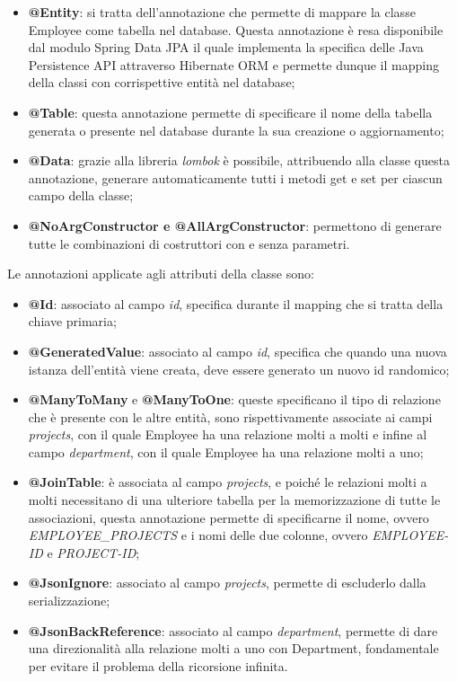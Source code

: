 \begin{itemize}
  \item \textbf{@Entity}: si tratta dell'annotazione che permette di mappare la classe Employee come tabella nel database. Questa annotazione è resa disponibile dal modulo Spring Data JPA il quale implementa la specifica delle Java Persistence API attraverso Hibernate ORM e permette dunque il mapping della classi con corrispettive entità nel database;
  \item \textbf{@Table}: questa annotazione permette di specificare il nome della tabella generata o presente nel database durante la sua creazione o aggiornamento;
  \item \textbf{@Data}: grazie alla libreria \textit{lombok} è possibile, attribuendo alla classe questa annotazione, generare automaticamente tutti i metodi get e set per ciascun campo della classe;
  \item \textbf{@NoArgConstructor e @AllArgConstructor}: permettono di generare tutte le combinazioni di costruttori con e senza parametri.
\end{itemize}
Le annotazioni applicate agli attributi della classe sono:
\begin{itemize}
  \item \textbf{@Id}: associato al campo \textit{id}, specifica durante il mapping che si tratta della chiave primaria;
  \item \textbf{@GeneratedValue}: associato al campo \textit{id}, specifica che quando una nuova istanza dell'entità viene creata, deve essere generato un nuovo id randomico;
  \item \textbf{@ManyToMany} e \textbf{@ManyToOne}: queste specificano il tipo di relazione che è presente con le altre entità, sono rispettivamente associate ai campi \textit{projects}, con il quale Employee ha una relazione molti a molti e infine al campo \textit{department}, con il quale Employee ha una relazione molti a uno;
  \item \textbf{@JoinTable}: è associata al campo \textit{projects}, e poiché le relazioni molti a molti necessitano di una ulteriore tabella per la memorizzazione di tutte le associazioni, questa annotazione permette di specificarne il nome, ovvero \textit{EMPLOYEE\_PROJECTS} e i nomi delle due colonne, ovvero \textit{EMPLOYEE-ID} e \textit{PROJECT-ID};
  \item \textbf{@JsonIgnore}: associato al campo \textit{projects}, permette di escluderlo dalla serializzazione;
  \item \textbf{@JsonBackReference}: associato al campo \textit{department}, permette di dare una direzionalità alla relazione molti a uno con Department, fondamentale per evitare il problema della ricorsione infinita.
\end{itemize}
